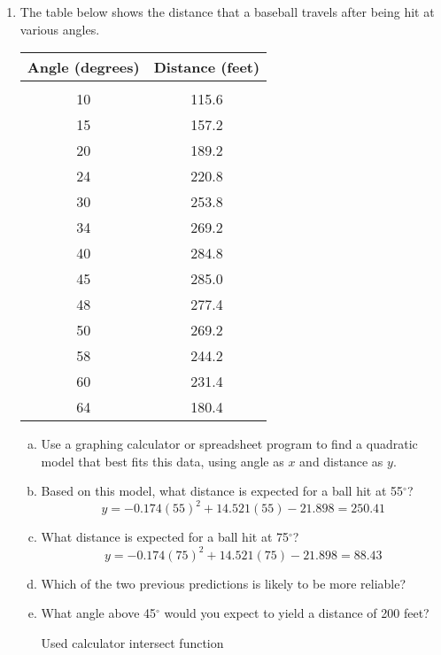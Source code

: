 \begin{enumerate}
\item The table below shows the distance that a baseball travels after being hit at various angles.
\begin{center}
\begin{tabular}{c c}
\textbf{Angle (degrees)} & \textbf{Distance (feet)}\\
\hline
 & \\
10 & 115.6\\
15 & 157.2\\
20 & 189.2\\
24 & 220.8\\
30 & 253.8\\
34 & 269.2\\
40 & 284.8\\
45 & 285.0\\
48 & 277.4\\
50 & 269.2\\
58 & 244.2\\
60 & 231.4\\
64 & 180.4
\end{tabular}
\end{center}
\begin{enumerate}[(a)]
\item Use a graphing calculator or spreadsheet program to find a quadratic model that best fits this data, using angle as $x$ and distance as $y$. 
\item Based on this model, what distance is expected for a ball hit at 55$^\circ$? 
\[y = -0.174(55)^2 + 14.521(55) - 21.898 = 250.41\]
\item What distance is expected for a ball hit at 75$^\circ$? 
\[y = -0.174(75)^2 + 14.521(75) - 21.898 = 88.43\]
\item Which of the two previous predictions is likely to be more reliable? 
\item What angle above 45$^\circ$ would you expect to yield a distance of 200 feet? 
\begin{center}
Used calculator intersect function
\end{center}
\end{enumerate}


\end{enumerate}
